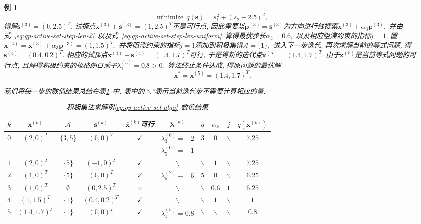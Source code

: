 \documentclass{SBCbookchapter}
\newcommand{\V}[1]{{\bm{#1}}}
\newtheorem{eg}[thm]{例}
\numberwithin{equation}{section}
\begin{document}
\begin{eg}
\begin{equation*}
\text{minimize} ~~ q(\V{s}) = s_1^2 + (s_2 - 2.5)^2,
\end{equation*}
得解$\V{s}^{(3)} = (0, 2.5)^T.$ 试探点$\V{x}^{(3)} + \V{s}^{(3)} = (1, 2.5)^T$不是可行点, 因此需要以$\V{p}^{(3)} = \V{s}^{(3)}$为方向进行线搜索$\V{x}^{(3)} + \alpha_3 \V{p}^{(3)},$ 并由式~\eqref{eq:qp-active-set-step-len-2}~以及式~\eqref{eq:qp-active-set-step-len-uniform}~算得最优步长$\alpha_3 = 0.6,$ 以及相应阻滞约束的指标$j = 1.$ 置$\V{x}^{(4)} = \V{x}^{(3)} + \alpha_3 \V{p}^{(3)} = (1, 1.5)^T,$ 并将阻滞约束的指标$j = 1$添加到积极集得$\mathcal{A} = \{ 1 \},$ 进入下一步迭代. 再次求解当前的等式问题, 得$\V{s}^{(4)} = (0.4, 0.2)^T.$ 相应的试探点$\V{x}^{(4)} + \V{s}^{(4)} = (1.4, 1.7)^T$可行, 于是得新的迭代点$\V{x}^{(5)} = (1.4, 1.7)^T.$ 由于$\V{x}^{(5)}$是当前等式问题的可行点, 且解得积极约束的拉格朗日乘子$\lambda_1^{(5)} = 0.8 > 0,$ 算法终止条件达成, 得原问题的最优解
\begin{equation*}
\V{x}^* = \V{x}^{(5)} = (1.4, 1.7)^T.
\end{equation*}

我们将每一步的数值结果总结在表\ref{tab:active-set-eg}~中. 表中的``$\backslash$''表示当前迭代步不需要计算相应的量.

\begin{table}[H]
    \caption{积极集法求解例\ref{eg:qp-active-set-algo}~数值结果}
    \label{tab:active-set-eg}
    \centering
    \begin{tabular}{cccccccccc}
    \hline
    $k$ & $\V{x}^{(k)}$ & $\mathcal{A}$ & $\V{s}^{(k)}$ & $\bar{\V{x}}^{(k)}$可行 & $\V{\lambda}^{(k)}$ & $q$ & $\alpha_k$ & $j$ & $q(\V{x}^{(k)})$ \\
    \hline
    \multirow{2}{*}{$0$} & \multirow{2}{*}{$(2, 0)^T$} & \multirow{2}{*}{$\{ 3, 5 \}$} & \multirow{2}{*}{$(0, 0)^T$} & \multirow{2}{*}{$\checkmark$} & $\lambda_3^{(0)} = -2$ & \multirow{2}{*}{$3$} & \multirow{2}{*}{$0$} & \multirow{2}{*}{$\backslash$} & \multirow{2}{*}{$7.25$} \\
    & & & & & $\lambda_5^{(0)} = -1$ & & & \\
    $1$ & $(2, 0)^T$ & $\{ 5 \}$ & $(-1, 0)^T$ & $\checkmark$ & $\backslash$ & $\backslash$ & $1$ & $\backslash$ & $7.25$ \\
    $2$ & $(1, 0)^T$ & $\{ 5 \}$ & $(0, 0)^T$ & $\checkmark$ & $\lambda_5^{(2)} = -5$ & $5$ & $0$ & $\backslash$ & $6.25$ \\
    $3$ & $(1, 0)^T$ & $\emptyset$ & $(0, 2.5)^T$ & $\times$ & $\backslash$ & $\backslash$ & $0.6$ & $1$ & $6.25$ \\
    $4$ & $(1, 1.5)^T$ & $\{ 1 \}$ & $(0.4, 0.2)^T$ & $\checkmark$ & $\backslash$ & $\backslash$ & $1$ & $\backslash$ & $1$ \\
    $5$ & $(1.4, 1.7)^T$ & $\{ 1 \}$ & $(0, 0)^T$ & $\checkmark$ & $\lambda_1^{(5)} = 0.8$ & $\backslash$ & $\backslash$ & $\backslash$ & $0.8$ \\
    \hline
    \end{tabular}
\end{table}
\end{eg}
\end{document}

